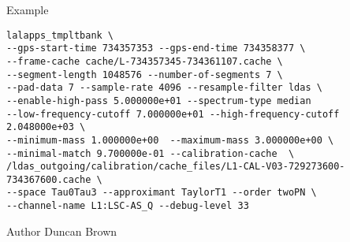 \begin{entry}
\item[Example]

\begin{verbatim}
lalapps_tmpltbank \
--gps-start-time 734357353 --gps-end-time 734358377 \
--frame-cache cache/L-734357345-734361107.cache \
--segment-length 1048576 --number-of-segments 7 \
--pad-data 7 --sample-rate 4096 --resample-filter ldas \
--enable-high-pass 5.000000e+01 --spectrum-type median
--low-frequency-cutoff 7.000000e+01 --high-frequency-cutoff 2.048000e+03 \
--minimum-mass 1.000000e+00  --maximum-mass 3.000000e+00 \
--minimal-match 9.700000e-01 --calibration-cache  \
/ldas_outgoing/calibration/cache_files/L1-CAL-V03-729273600-734367600.cache \
--space Tau0Tau3 --approximant TaylorT1 --order twoPN \
--channel-name L1:LSC-AS_Q --debug-level 33

\end{verbatim}

\item[Author]
\noindent Duncan Brown
\end{entry}
